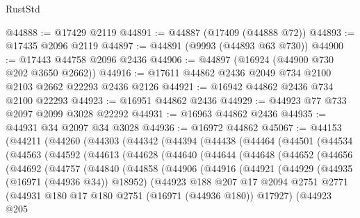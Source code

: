 \begin{lexlean}{RustStd}
\begin{coremodule}
@44888 := @17429 @2119
@44891 := @44887 (@17409 (@44888 @72))
@44893 := @17435 @2096 @2119
@44897 := @44891 (@9993 (@44893 @63 @730))
@44900 := @17443 @44758 @2096 @2436
@44906 := @44897 (@16924 (@44900 @730 @202 @3650 @2662))
@44916 := @17611 @44862 @2436 @2049 @734 @2100 @2103 @2662 @22293 @2436 @2126
@44921 := @16942 @44862 @2436 @734 @2100 @22293
@44923 := @16951 @44862 @2436
@44929 := @44923 @77 @733 @2097 @2099 @3028 @22292
@44931 := @16963 @44862 @2436
@44935 := @44931 @34 @2097 @34 @3028
@44936 := @16972 @44862
@45067 := @44153
    (@44211
      (@44260
        (@44303
          (@44342
            (@44394
              (@44438
                (@44464
                  (@44501
                    (@44534
                      (@44563
                        (@44592
                          (@44613
                            (@44628
                              (@44640
                                (@44644
                                  (@44648
                                    (@44652
                                      (@44656
                                        (@44692
                                          (@44757
                                            (@44840
                                              (@44858
                                                (@44906
                                                  (@44916
                                                    (@44921
                                                      (@44929
                                                        (@44935 (@16971 (@44936 @34)) @18952)
                                                        (@44923
                                                          @188
                                                          @207
                                                          @17
                                                          @2094
                                                          @2751
                                                          @2771
                                                          (@44931
                                                            @180
                                                            @17
                                                            @180
                                                            @2751
                                                            (@16971 (@44936 @180))
                                                            @17927)
                                                          (@44923
                                                            @205

\end{coremodule}
\end{lexlean}
